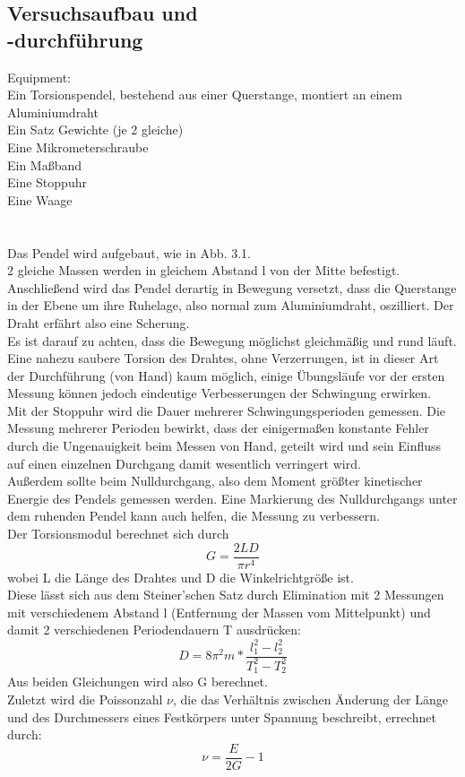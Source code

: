 \documentclass[12pt,a4paper]{article}
\begin{document}
\begin{multicols}{2}
\subsection{Versuchsaufbau und \\-durchführung}
Equipment:\\
Ein Torsionspendel, bestehend aus einer Querstange, montiert an einem Aluminiumdraht\\
Ein Satz Gewichte (je 2 gleiche)\\
Eine Mikrometerschraube\\
Ein Maßband\\
Eine Stoppuhr\\
Eine Waage\\
\\
\\
Das Pendel wird aufgebaut, wie in Abb. 3.1.\\
2 gleiche Massen werden in gleichem Abstand l von der Mitte befestigt. Anschließend wird das Pendel derartig in Bewegung versetzt, dass die Querstange in der Ebene um ihre Ruhelage, also normal zum Aluminiumdraht, oszilliert. Der Draht erfährt also eine Scherung.\\
Es ist darauf zu achten, dass die Bewegung möglichst gleichmäßig und rund läuft. Eine nahezu saubere Torsion des Drahtes, ohne Verzerrungen, ist in dieser Art der Durchführung (von Hand) kaum möglich, einige Übungsläufe vor der ersten Messung können jedoch eindeutige Verbesserungen der Schwingung erwirken.\\
Mit der Stoppuhr wird die Dauer mehrerer Schwingungsperioden gemessen. Die Messung mehrerer Perioden bewirkt, dass der einigermaßen konstante Fehler durch die Ungenauigkeit beim Messen von Hand, geteilt wird und sein Einfluss auf einen einzelnen Durchgang damit wesentlich verringert wird.\\
Außerdem sollte beim Nulldurchgang, also dem Moment größter kinetischer Energie des Pendels gemessen werden. Eine Markierung des Nulldurchgangs unter dem ruhenden Pendel kann auch helfen, die Messung zu verbessern.\\
Der Torsionsmodul berechnet sich durch\\
$$G = \frac{2LD}{\pi r^4}$$
wobei L die Länge des Drahtes und D die Winkelrichtgröße ist.\\
Diese lässt sich aus dem Steiner'schen Satz durch Elimination mit 2 Messungen mit verschiedenem Abstand l (Entfernung der Massen vom Mittelpunkt) und damit 2 verschiedenen Periodendauern T ausdrücken:\\
$$ D=8\pi ^2 m* \frac{l_1^2-l_2^2}{T_1^2-T_2^2}$$
Aus beiden Gleichungen wird also G berechnet.\\
Zuletzt wird die Poissonzahl $\nu$, die das Verhältnis zwischen Änderung der Länge und des Durchmessers eines Festkörpers unter Spannung beschreibt, errechnet durch:\\
$$ \nu = \frac{E}{2G}-1$$


\end{multicols}
\end{document}
